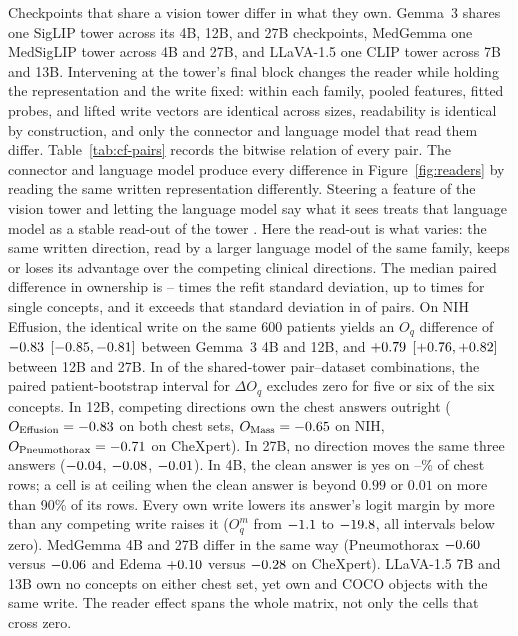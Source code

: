 Checkpoints that share a vision tower differ in what they own. Gemma~3 shares one SigLIP tower across its 4B, 12B, and 27B checkpoints, MedGemma one MedSigLIP tower across 4B and 27B, and LLaVA-1.5 one CLIP tower across 7B and 13B. Intervening at the tower's final block changes the reader while holding the representation and the write fixed: within each family, pooled features, fitted probes, and lifted write vectors are identical across sizes, readability is identical by construction, and only the connector and language model that read them differ. Table~\ref{tab:cf-pairs} records the bitwise relation of every pair. The connector and language model produce every difference in Figure~\ref{fig:readers} by reading the same written representation differently. Steering a feature of the vision tower and letting the language model say what it sees treats that language model as a stable read-out of the tower \citep{ferrando2026explain}. Here the read-out is what varies: the same written direction, read by a larger language model of the same family, keeps or loses its advantage over the competing clinical directions. The median paired difference in ownership is \cfPairsRatioMin{}--\cfPairsRatioMax{} times the refit standard deviation, up to \cfPairsRatioSingleMax{} times for single concepts, and it exceeds that standard deviation in \cfPairsRatioAboveOne{} of \cfPairsRatioN{} pairs. On NIH Effusion, the identical write on the same 600 patients yields an $O_q$ difference of $-0.83$ $[-0.85,-0.81]$ between Gemma~3 4B and 12B, and $+0.79$ $[+0.76,+0.82]$ between 12B and 27B. In \cfPairsFiveOrSix{} of the \cfPairsN{} shared-tower pair--dataset combinations, the paired patient-bootstrap interval for $\Delta O_q$ excludes zero for five or six of the six concepts. In 12B, competing directions own the chest answers outright ($O_{\mathrm{Effusion}}=-0.83$ on both chest sets, $O_{\mathrm{Mass}}=-0.65$ on NIH, $O_{\mathrm{Pneumothorax}}=-0.71$ on CheXpert). In 27B, no direction moves the same three answers ($-0.04$, $-0.08$, $-0.01$). In 4B, the clean answer is yes on \cfGemmaFourYesMin--\cfGemmaFourYesMax\% of chest rows; a cell is at ceiling when the clean answer is beyond $0.99$ or $0.01$ on more than 90\% of its rows. Every own write lowers its answer's logit margin by more than any competing write raises it ($O^m_q$ from $-1.1$ to $-19.8$, all intervals below zero). MedGemma 4B and 27B differ in the same way (Pneumothorax $-0.60$ versus $-0.06$ and Edema $+0.10$ versus $-0.28$ on CheXpert). LLaVA-1.5 7B and 13B own no concepts on either chest set, yet own \cfLlavaSevenCoco{} and \cfLlavaThirteenCoco{} COCO objects with the same write. The reader effect spans the whole matrix, not only the cells that cross zero.

